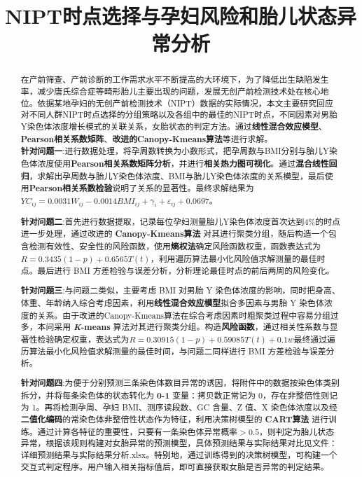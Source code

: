 \documentclass[withoutpreface,bwprint]{cumcmthesis}
\title{NIPT时点选择与孕妇风险和胎儿状态异常分析}  %
\begin{document}
\maketitle
\begin{abstract}
\indent 在产前筛查、产前诊断的工作需求水平不断提高的大环境下，为了降低出生缺陷发生率，减少唐氏综合症等畸形胎儿主要出现的问题，发展无创产前检测技术处在核心地位。依据某地孕妇的无创产前检测技术（NIPT）数据的实际情况，本文主要研究回应对不同人群NIPT时点选择的分组策略以及各组中的最佳的NIPT时点，不同因素对男胎Y染色体浓度增长模式的关联关系，女胎状态的判定方法。通过\textbf{线性混合效应模型}、\textbf{Pearson相关系数矩阵}、\textbf{改进的Canopy-Kmeans算法}等进行求解。\\\indent
\textbf{针对问题一}:进行数据处理，将孕周数转换为小数形式，把孕周数与BMI分别与胎儿Y染色体浓度使用\textbf{Pearson相关系数矩阵分析}，并进行\textbf{相关热力图可视化}。通过\textbf{混合线性回归}，求解出孕周数与胎儿Y染色体浓度、BMI与胎儿Y染色体浓度的关系模型，最后使用\textbf{Pearson相关系数检验}说明了关系的显著性。最终求解结果为\( YC_{ij} = 0.0031W_{ij}-0.0014BMI_{ij} + \gamma_i + \varepsilon_{ij} + 0.0697\)。

\textbf{针对问题二}:首先进行数据提取，记录每位孕妇测量胎儿Y染色体浓度首次达到4\%的时点进一步处理，通过改进的 \textbf{Canopy-Kmeans算法} 对其进行聚类分组，随后构造一个包含检测有效性、安全性的风险函数，使用\textbf{熵权法}确定风险函数权重，函数表达式为\(R = 0.3435(1 - p) + 0.6565T(t)\)，利用遍历算法最小化风险值求解测量的最佳时点。最后进行 BMI 方差检验与误差分析，分析理论最佳时点的前后两周的风险变化。

\textbf{针对问题三}:与问题二类似，主要考虑 BMI 对男胎 Y 染色体浓度的影响，同时把身高、体重、年龄纳入综合考虑因素，利用\textbf{线性混合效应模型}拟合多因素与男胎 Y 染色体浓度的关系。由于改进的Canopy-Kmeans算法在综合考虑因素时粗聚类过程中容易分组过多，本问采用 \textbf{\textit{K}-means} 算法对其进行聚类分组。构造\textbf{风险函数}，通过相关性系数与显著性检验确定权重，表达式为\(R = 0.30915(1 - p) + 0.59085T(t) + 0.1w\)最终通过遍历算法最小化风险值求解测量的最佳时间，与问题二同样进行 BMI 方差检验与误差分析。

\textbf{针对问题四}:为便于分别预测三条染色体数目异常的诱因，将附件中的数据按染色体类别拆分，并将每条染色体的状态转化为 \textbf{0-1} 变量：拷贝数正常记为 0，存在非整倍性则记为 1。再将检测孕周、孕妇 BMI、测序读段数、GC 含量、Z 值、X 染色体浓度以及经\textbf{二值化编码}的常染色体非整倍性状态作为特征，利用决策树模型的 \textbf{CART算法} 进行训练。通过计算各特征的重要性，只要有一条染色体异常概率$> 0.5$，则判定为胎儿状态异常，根据该规则构建对女胎异常的预测模型，具体预测结果与实际结果对比见文件：详细预测结果与实际结果分析.xlsx。特别地，通过训练得到的决策树模型，可构建一个交互式判定程序。用户输入相关指标值后，即可直接获取女胎是否异常的判定结果。



\end{abstract}
\end{document}
